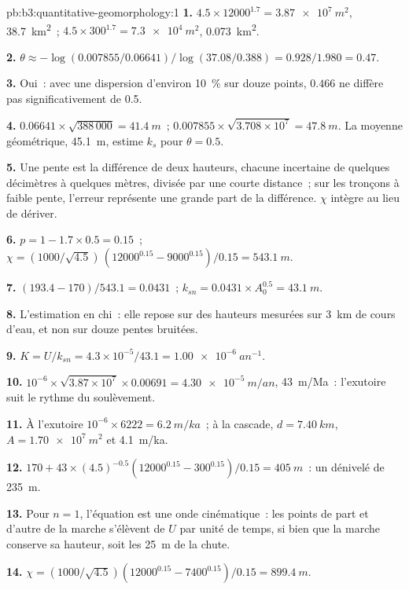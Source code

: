 \begin{solution}{pb:b3:quantitative-geomorphology:1}
\textbf{1.} $4.5\times12000^{1.7} = \qty{3.87e7}{m^2}$, \qty{38.7}{km^2}~;
$4.5\times300^{1.7} = \qty{7.3e4}{m^2}$, \qty{0.073}{km^2}.

\textbf{2.} $\theta \approx -\log(0.007855/0.06641)/\log(37.08/0.388) =
0.928/1.980 = 0.47$.

\textbf{3.} Oui~: avec une dispersion d'environ \qty{10}{\percent} sur douze points,
$0.466$ ne diffère pas significativement de 0.5.

\textbf{4.} $0.06641\times\sqrt{388\,000} = \qty{41.4}{m}$~;
$0.007855\times\sqrt{3.708\times10^7} = \qty{47.8}{m}$. La moyenne géométrique,
\qty{45.1}{m}, estime $k_s$ pour $\theta = 0.5$.

\textbf{5.} Une pente est la différence de deux hauteurs, chacune incertaine
de quelques décimètres à quelques mètres, divisée par une courte distance~; sur les
tronçons à faible pente, l'erreur représente une grande part de la différence. $\chi$ intègre au lieu de
dériver.

\textbf{6.} $p = 1 - 1.7\times0.5 = 0.15$~; $\chi = (1000/\sqrt{4.5})\,
(12000^{0.15} - 9000^{0.15})/0.15 = \qty{543.1}{m}$.

\textbf{7.} $(193.4 - 170)/543.1 = 0.0431$~; $k_{sn} = 0.0431\times A_0^{0.5}
= \qty{43.1}{m}$.

\textbf{8.} L'estimation en chi~: elle repose sur des hauteurs mesurées sur \qty{3}{km} de
cours d'eau, et non sur douze pentes bruitées.

\textbf{9.} $K = U/k_{sn} = 4.3\times10^{-5}/43.1 = \qty{1.00e-6}{an^{-1}}$.

\textbf{10.} $10^{-6}\times\sqrt{3.87\times10^7}\times0.00691 =
\qty{4.30e-5}{m/an}$, \qty{43}{m/Ma}~: l'exutoire suit le rythme du
soulèvement.

\textbf{11.} À l'exutoire $10^{-6}\times6222 = \qty{6.2}{m/ka}$~; à la
cascade, $d = \qty{7.40}{km}$, $A = \qty{1.70e7}{m^2}$ et
\qty{4.1}{m/ka}.

\textbf{12.} $170 + 43\times(4.5)^{-0.5}(12000^{0.15} - 300^{0.15})/0.15 =
\qty{405}{m}$~: un dénivelé de \qty{235}{m}.

\textbf{13.} Pour $n = 1$, l'équation est une onde cinématique~: les points de part et
d'autre de la marche s'élèvent de $U$ par unité de temps, si bien que la marche conserve sa hauteur,
soit les \qty{25}{m} de la chute.

\textbf{14.} $\chi = (1000/\sqrt{4.5})(12000^{0.15} - 7400^{0.15})/0.15 =
\qty{899.4}{m}$.


\end{solution}
